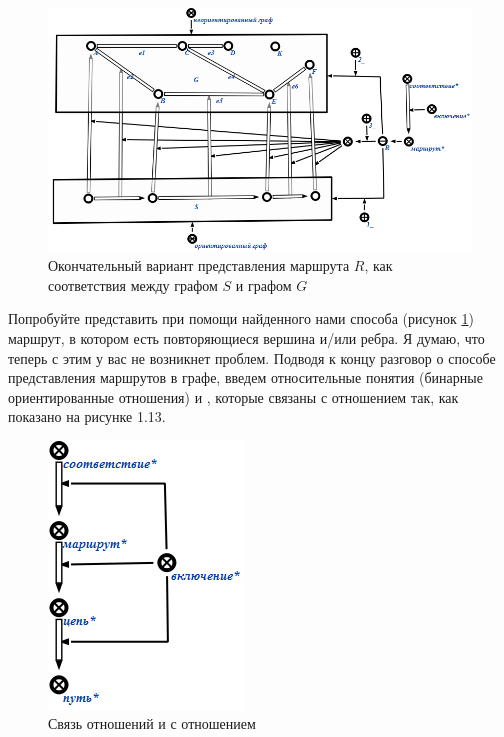 \begin{figure}[h!]
  \centering
  \includegraphics[scale=0.6]{images/2/Route_as_correspondence_Final}
  \caption{Окончательный вариант представления маршрута $R$, как
    соответствия между графом $S$ и графом $G$}
  \label{fig:Route_as_correspondence_Final}
\end{figure}

Попробуйте представить при помощи найденного нами способа (рисунок
\ref{fig:Route_as_correspondence_Final}) маршрут, в котором есть
повторяющиеся вершина и/или ребра. Я думаю, что теперь с этим у вас не
возникнет проблем. Подводя к концу разговор о способе представления
маршрутов в графе, введем относительные понятия (бинарные
ориентированные отношения)  и , которые связаны с
отношением  так, как показано на рисунке 1.13.

\begin{figure}[h!]
  \centering
  \includegraphics[scale=0.8]{images/2/Relations_Trail_and_Path}
  \caption{Связь отношений  и  с отношением
    }
  \label{fig:Relations_Trail_and_Path}
\end{figure}

